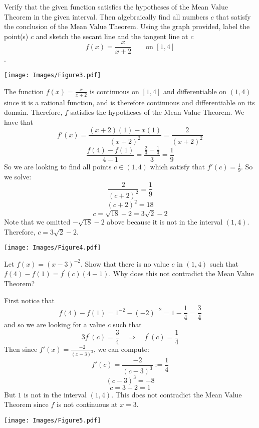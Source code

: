 \documentclass[nooutcomes]{ximera}
\renewenvironment{freeResponse}{
\ifhandout\setbox0\vbox\bgroup\else
\begin{trivlist}\item[\hskip \labelsep\bfseries Solution:\hspace{2ex}]
\fi}
{\ifhandout\egroup\else
\end{trivlist}
\fi}
\begin{document}
\begin{problem}
  Verify that the given function satisfies the hypotheses of the Mean Value Theorem in the given interval.
  Then algebraically find all numbers $c$ that satisfy the conclusion of the Mean Value Theorem.
  Using the graph provided, label the point(s) $c$ and sketch the secant line and the tangent line at $c$
  $$ f(x) = \frac{x}{x+2} \qquad \text{on } [1,4] $$.
  \begin{image}
    \texttt{[image: Images/Figure3.pdf]}
  \end{image}
  \begin{freeResponse}
    The function $f(x) = \frac{x}{x+2}$ is continuous on $[1,4]$ and differentiable on $(1,4)$ since it is a rational function, and is therefore continuous and differentiable on its domain.
    Therefore, $f$ satisfies the hypotheses of the Mean Value Theorem.
    We have that
    $$ f'(x) = \frac{(x+2)(1) - x(1)}{(x+2)^2} = \frac{2}{(x+2)^2} $$
    $$ \frac{f(4) - f(1)}{4-1} = \frac{\frac{2}{3} - \frac{1}{3}}{3} = \frac{1}{9} $$
    So we are looking to find all points $c \in (1,4)$ which satisfy that $ f'(c) = \frac{1}{9} $.  So we solve:
    $$ \frac{2}{(c+2)^2} = \frac{1}{9} $$
    $$ (c+2)^2 = 18 $$
    $$ c = \sqrt{18} - 2 = 3\sqrt{2} - 2 $$
    Note that we omitted $-\sqrt{18} - 2$ above because it is not in the interval $(1,4)$.  Therefore, $c = 3\sqrt{2} - 2$.
    
    \begin{image}
      \texttt{[image: Images/Figure4.pdf]}
    \end{image}
  \end{freeResponse}
\end{problem}

\begin{problem}
  Let $f(x) = (x-3)^{-2}$.
  Show that there is no value $c$ in $(1,4)$ such that $f(4) - f(1) = f^{\prime}(c) (4-1)$.
  Why does this not contradict the Mean Value Theorem?
  \begin{freeResponse}
    First notice that 
    $$f(4)-f(1) = 1^{-2} - (-2)^{-2} = 1-\frac{1}{4} = \frac{3}{4}$$
    and so we are looking for a value $c$ such that 
    $$3 f^\prime (c) = \frac{3}{4} \quad \Longrightarrow \quad f^\prime (c) = \frac{1}{4} $$
    Then since $f'(x) = \frac{-2}{(x-3)^3}$, we can compute:
    $$ f'(c) = \frac{-2}{(c-3)^3} := \frac{1}{4}$$
    $$ (c-3)^3 = - 8 $$
    $$ c = 3 - 2 = 1 $$
    But $1$ is not in the interval $(1,4)$.  This does not contradict the Mean Value Theorem since $f$ is not continuous at $x=3$.

    \begin{image}
      \texttt{[image: Images/Figure5.pdf]}
    \end{image}
  \end{freeResponse}
\end{problem}
\end{document}
